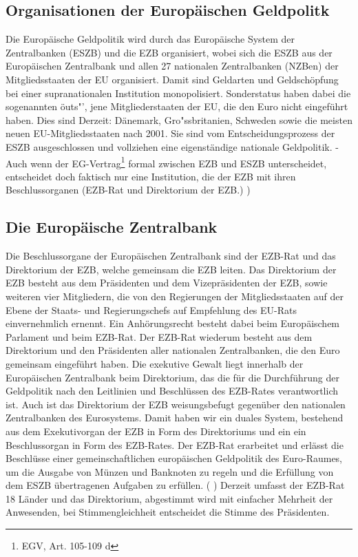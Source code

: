 \documentclass[
    onecolumn,
    a4paper,
    abstracton,
    parskip=half
    ,final
    ]{scrartcl}
\begin{document}
\subsection{Organisationen der Europ{\"a}ischen Geldpolitk}

Die Europ{\"a}ische Geldpolitik wird durch das Europ{\"a}ische System der Zentralbanken (ESZB) und die EZB organisiert, wobei sich die ESZB aus der Europ{\"a}ischen Zentralbank und allen 27 nationalen Zentralbanken (NZBen) der Mitgliedsstaaten der EU organisiert.  Damit sind Geldarten und Geldsch{\"o}pfung bei einer supranationalen Institution monopolisiert. Sonderstatus haben dabei die sogenannten \"outs"', jene Mitgliederstaaten der EU, die den Euro  nicht eingef{\"u}hrt haben. Dies sind Derzeit: D{\"a}nemark, Gro{"ss}britanien, Schweden sowie die meisten neuen EU-Mitgliedsstaaten nach 2001. Sie sind vom Entscheidungsprozess der ESZB ausgeschlossen und vollziehen eine eigenst{\"a}ndige nationale Geldpolitik.
-Auch wenn der EG-Vertrag\footnote[25]{EGV, Art. 105-109 d} formal zwischen EZB und ESZB unterscheidet, entscheidet doch faktisch nur eine Institution, die der EZB mit ihren Beschlussorganen (EZB-Rat und Direktorium der EZB.) \citep[vgl.][S.553]{Basseler2010})

\subsection{Die Europ{\"a}ische Zentralbank}
Die Beschlussorgane der Europ{\"a}ischen Zentralbank sind der EZB-Rat und das Direktorium der EZB, welche gemeinsam die EZB leiten. Das Direktorium der EZB besteht aus dem Pr{\"a}sidenten und dem Vizepr{\"a}sidenten der EZB, sowie weiteren vier Mitgliedern, die von den Regierungen der Mitgliedsstaaten auf der Ebene der Staats- und Regierungschefs auf Empfehlung des EU-Rats einvernehmlich ernennt. Ein Anh{\"o}rungsrecht besteht dabei beim Europ{\"a}ischem Parlament und beim EZB-Rat.
Der EZB-Rat wiederum besteht aus dem Direktorium und den Pr{\"a}sidenten aller nationalen Zentralbanken, die den Euro gemeinsam eingef{\"u}hrt haben.
Die exekutive Gewalt liegt innerhalb der Europ{\"a}ischen Zentralbank beim Direktorium, das die f{\"u}r die Durchf{\"u}hrung der Geldpolitik nach den Leitlinien und Beschl{\"u}ssen des EZB-Rates verantwortlich ist. Auch ist das Direktorium der EZB weisungsbefugt gegen{\"u}ber den nationalen Zentralbanken des Eurosystems.  Damit haben wir ein duales System, bestehend aus dem Exekutivorgan der EZB in Form des Direktoriums und ein ein Beschlussorgan in Form des EZB-Rates.
Der EZB-Rat erarbeitet und erl{\"a}sst die Beschl{\"u}sse einer gemeinschaftlichen europ{\"a}ischen Geldpolitik des Euro-Raumes, um die Ausgabe von M{\"u}nzen und Banknoten zu regeln und die Erf{\"u}llung von dem ESZB {\"u}bertragenen Aufgaben zu erf{\"u}llen.  ( \citep[vgl.][S.553]{Basseler2010} ) Derzeit umfasst der EZB-Rat 18 L{\"a}nder und das Direktorium, abgestimmt wird mit einfacher Mehrheit der Anwesenden, bei Stimmengleichheit entscheidet die Stimme des Pr{\"a}sidenten.
\end{document}
